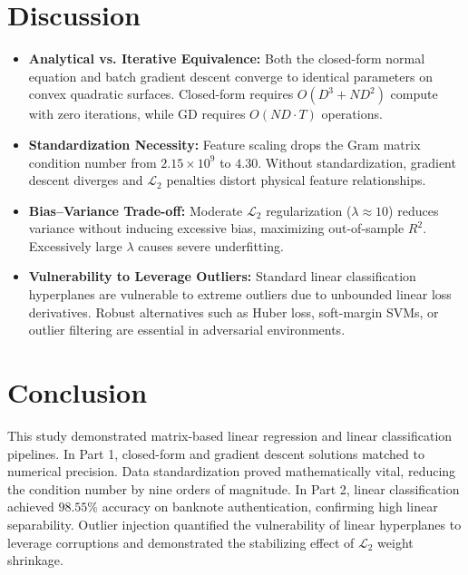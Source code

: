 \documentclass[12pt,a4paper]{article}
\begin{document}
\section{Discussion}
\begin{itemize}
    \item \textbf{Analytical vs. Iterative Equivalence:} Both the closed-form normal equation and batch gradient descent converge to identical parameters on convex quadratic surfaces. Closed-form requires $O(D^3 + ND^2)$ compute with zero iterations, while GD requires $O(ND \cdot T)$ operations.
    \item \textbf{Standardization Necessity:} Feature scaling drops the Gram matrix condition number from $2.15 \times 10^9$ to $4.30$. Without standardization, gradient descent diverges and $\mathcal{L}_2$ penalties distort physical feature relationships.
    \item \textbf{Bias--Variance Trade-off:} Moderate $\mathcal{L}_2$ regularization ($\lambda \approx 10$) reduces variance without inducing excessive bias, maximizing out-of-sample $R^2$. Excessively large $\lambda$ causes severe underfitting.
    \item \textbf{Vulnerability to Leverage Outliers:} Standard linear classification hyperplanes are vulnerable to extreme outliers due to unbounded linear loss derivatives. Robust alternatives such as Huber loss, soft-margin SVMs, or outlier filtering are essential in adversarial environments.
\end{itemize}

\section{Conclusion}
This study demonstrated matrix-based linear regression and linear classification pipelines. In Part 1, closed-form and gradient descent solutions matched to numerical precision. Data standardization proved mathematically vital, reducing the condition number by nine orders of magnitude. In Part 2, linear classification achieved $98.55\%$ accuracy on banknote authentication, confirming high linear separability. Outlier injection quantified the vulnerability of linear hyperplanes to leverage corruptions and demonstrated the stabilizing effect of $\mathcal{L}_2$ weight shrinkage.
\end{document}
